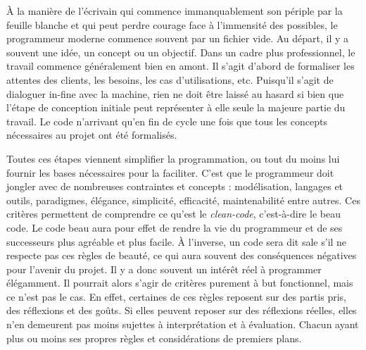 \documentclass[12pt]{article} %
\begin{document}
À la manière de l'écrivain qui commence immanquablement son périple par la feuille blanche et qui peut perdre courage face à l'immensité des possibles, le programmeur moderne commence souvent par un fichier vide. Au départ, il y a souvent une idée, un concept ou un objectif. Dans un cadre plus professionnel, le travail commence généralement bien en amont. Il s'agit d'abord de formaliser les attentes des clients, les besoins, les cas d'utilisations, etc. Puisqu'il s'agit de dialoguer in-fine avec la machine, rien ne doit être laissé au hasard si bien que l'étape de conception initiale peut représenter à elle seule la majeure partie du travail. Le code n'arrivant qu'en fin de cycle une fois que tous les concepts nécessaires au projet ont été formalisés. 

Toutes ces étapes viennent simplifier la programmation, ou tout du moins lui fournir les bases nécessaires pour la faciliter. C'est que le programmeur doit jongler avec de nombreuses contraintes et concepts : modélisation, langages et outils, paradigmes, élégance, simplicité, efficacité, maintenabilité entre autres. Ces critères permettent de comprendre ce qu'est le \textit{clean-code}, c'est-à-dire le beau code. Le code beau aura pour effet de rendre la vie du programmeur et de ses successeurs plus agréable et plus facile. À l'inverse, un code sera dit sale s'il ne respecte pas ces règles de beauté, ce qui aura souvent des conséquences négatives pour l'avenir du projet. Il y a donc souvent un intérêt réel à programmer élégamment. Il pourrait alors s'agir de critères purement à but fonctionnel, mais ce n'est pas le cas. En effet, certaines de ces règles reposent sur des partis pris, des réflexions et des goûts. Si elles peuvent reposer sur des réflexions réelles, elles n'en demeurent pas moins sujettes à interprétation et à évaluation. Chacun ayant plus ou moins ses propres règles et considérations de premiers plans. 
\end{document}
